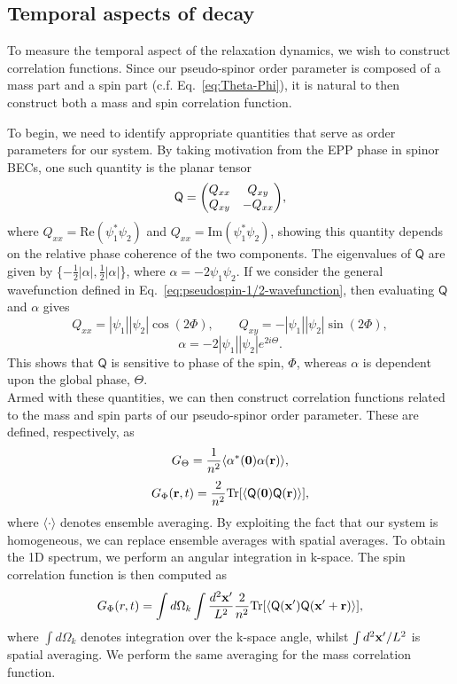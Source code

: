 \subsection{Temporal aspects of decay}
To measure the temporal aspect of the relaxation dynamics, we wish to
construct correlation functions.
Since our pseudo-spinor order parameter is composed of a mass part and a spin
part (c.f. Eq.~\eqref{eq:Theta-Phi}), it is natural to then construct both a
mass and spin correlation function.\par
To begin, we need to identify appropriate quantities that serve as order
parameters for our system.
By taking motivation from the EPP phase in spinor BECs, one such quantity is
the planar tensor~\cite{Symes2017}
\begin{equation}
    \mathsf{Q} = \mqty(Q_{xx} & Q_{xy} \\ Q_{xy} & -Q_{xx}),
\end{equation}
where $Q_{xx} = \mathrm{Re}(\psi_1^*\psi_2)$ and
$Q_{xx} = \mathrm{Im}(\psi_1^*\psi_2)$, showing this quantity depends on the
relative phase coherence of the two components.
The eigenvalues of $\mathsf{Q}$ are given by
\{$-\frac{1}{2}|\alpha|, \frac{1}{2}|\alpha|$\}, where
$\alpha=-2\psi_1\psi_2$.
If we consider the general wavefunction defined in
Eq.~\eqref{eq:pseudospin-1/2-wavefunction}, then evaluating $\mathsf{Q}$ and
$\alpha$ gives
\begin{equation}
    Q_{xx} = |\psi_1||\psi_2|\cos({2\Phi}), \qquad 
    Q_{xy} = -|\psi_1||\psi_2|\sin({2\Phi}),
\end{equation}
\begin{equation}
    \alpha = -2|\psi_1||\psi_2|e^{2i\Theta}.
\end{equation}
This shows that $\mathsf{Q}$ is sensitive to phase of the spin,
$\Phi$, whereas $\alpha$ is dependent upon the global phase, $\Theta$.\\
Armed with these quantities, we can then construct correlation functions related
to the mass and spin parts of our pseudo-spinor order parameter.
These are defined, respectively, as
\begin{equation}
    G_\Theta = \frac{1}{n^2}\langle \alpha^*(\vb{0})\alpha(\vb{r}) \rangle,
\end{equation}
\begin{equation}
    G_\Phi(\vb{r}, t) = 
    \frac{2}{n^2}\mathrm{Tr}
    [\langle \mathsf{Q}(\vb{0})\mathsf{Q}(\vb{r})\rangle],
\end{equation}
where $\langle \cdot \rangle$ denotes ensemble averaging.
By exploiting the fact that our system is homogeneous, we can replace ensemble
averages with spatial averages.
To obtain the 1D spectrum, we perform an angular integration in k-space.
The spin correlation function is then computed as
\begin{equation}
    G_\Phi(r, t) = \int d\Omega_k \int \frac{d^2\vb{x}'}{L^2}
    \frac{2}{n^2}\mathrm{Tr}
    [\langle \mathsf{Q}(\vb{x'})\mathsf{Q}(\vb{x}' + \vb{r})\rangle],
\end{equation}
where $\int d\Omega_k$ denotes integration over the k-space angle, whilst
$\int d^2\vb{x}'/L^2$ is spatial averaging.
We perform the same averaging for the mass correlation function. \par

